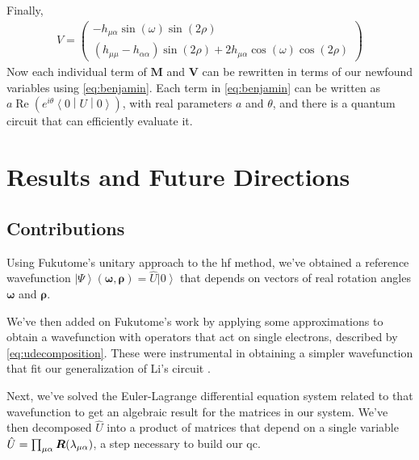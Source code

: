 \documentclass{aux/ttuthes2007}
\newcommand{\ket}[1]{\ensuremath{\left|#1\right\rangle}}
\newcommand{\sandwich}[3]{\left< #1 \middle\vert #2 \middle\vert #3 \right>}
\newcommand{\s}[1]{\sin\left( #1 \right)}
\newcommand{\co}[1]{\cos\left( #1 \right)}
\newcommand{\paren}[1]{\left( #1 \right)}
\newcommand{\ind}[1]{{\uo #1 \oo #1}}
\newcommand{\uo}[1]{
		\IfEqCase{#1}{
			{0}{\mu}
			{1}{\nu}
			{2}{\xi}
		}[\PackageError{uo}{Undefined option to uo: #1}{}]
}
\newcommand{\oo}[1]{
		\IfEqCase{#1}{
			{0}{\alpha}
			{1}{\beta}
			{2}{\gamma}
		}[\PackageError{unocorb}{Undefined option to unuo: #1}{}]
}
\begin{document}
%
Finally,
%
\begin{equation*}
	\begin{split}
		V = \begin{pmatrix}
			- h_{\mu\alpha} \s \omega \s {2\rho} \\
			(h_{\mu\mu} - h_{\alpha\alpha}) \s {2\rho}
			+ 2h_{\mu\alpha} \co \omega \co {2\rho}
		\end{pmatrix}
	\end{split}
\end{equation*}
%
Now each individual term of $\bm M$ and $\bm V$ can be rewritten in terms of our newfound variables using \ref{eq:benjamin}.
%
Each term in \ref{eq:benjamin} can be written as $a\operatorname{Re}\paren{e^{i\theta}\sandwich 0 U 0}$, with real parameters $a$ and $\theta$, and there is a quantum circuit that can efficiently evaluate it.
%
%


\chapter{\textbf{Results and Future Directions}}\label{chap:results}

\section{\textbf{Contributions}}
Using Fukutome's  unitary approach to the \gls{hf} method, we've obtained a reference wavefunction $\ket \Psi(\bm \omega, \bm \rho) = \hat U\ket 0$ that depends on vectors of real rotation angles $\bm \omega$ and $\bm \rho$. 

We've then added on Fukutome's work by applying some approximations to obtain a wavefunction with operators that act on single electrons, described by \ref{eq:udecomposition}. These were instrumental in obtaining a simpler wavefunction that fit our generalization of Li's circuit .

Next, we've solved the Euler-Lagrange differential equation system related to that wavefunction to get an algebraic result for the matrices in our system.
We've then decomposed $\hat U$ into a product of matrices that depend on a single variable $\hat U = \prod_{\ind 0} \bm R(\lambda_{\ind 0})$, a step necessary to build our \gls{qc}.
\end{document}
